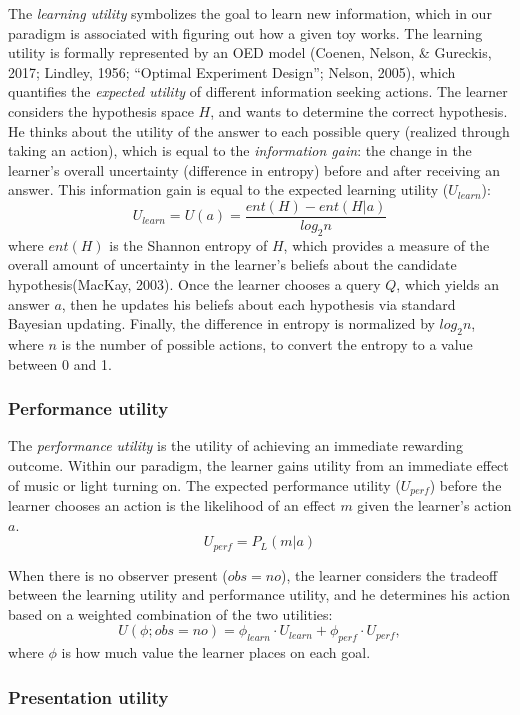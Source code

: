 \documentclass[10pt, letterpaper]{article}
\begin{document}
The \emph{learning utility} symbolizes the goal to learn new
information, which in our paradigm is associated with figuring out how a
given toy works. The learning utility is formally represented by an OED
model (Coenen, Nelson, \& Gureckis, 2017; Lindley, 1956; ``Optimal
Experiment Design''; Nelson, 2005), which quantifies the \emph{expected
utility} of different information seeking actions. The learner considers
the hypothesis space \(H\), and wants to determine the correct
hypothesis. He thinks about the utility of the answer to each possible
query (realized through taking an action), which is equal to the
\emph{information gain}: the change in the learner's overall uncertainty
(difference in entropy) before and after receiving an answer. This
information gain is equal to the expected learning utility
(\(U_{learn}\)):
\[ U_{learn} = U(a) = \frac{ent(H) - ent(H|a)}{log_2n}\] \noindent
where \(ent(H)\) is the Shannon entropy of \(H\), which provides a
measure of the overall amount of uncertainty in the learner's beliefs
about the candidate hypothesis(MacKay, 2003). Once the learner chooses a
query \(Q\), which yields an answer \(a\), then he updates his beliefs
about each hypothesis via standard Bayesian updating. Finally, the
difference in entropy is normalized by \(log_2 n\), where \(n\) is the
number of possible actions, to convert the entropy to a value between 0
and 1.

\subsubsection{Performance utility}\label{performance-utility}

The \emph{performance utility} is the utility of achieving an immediate
rewarding outcome. Within our paradigm, the learner gains utility from
an immediate effect of music or light turning on. The expected
performance utility (\(U_{perf}\)) before the learner chooses an action
is the likelihood of an effect \(m\) given the learner's action \(a\).
\[ U_{perf} = P_L(m | a) \] \noindent

When there is no observer present (\(obs = no\)), the learner considers
the tradeoff between the learning utility and performance utility, and
he determines his action based on a weighted combination of the two
utilities:
\[ U(\phi; obs = no) = \phi_{learn} \cdot U_{learn} + \phi_{perf} \cdot U_{perf} ,\]
\noindent
where \(\phi\) is how much value the learner places on each goal.

\subsubsection{Presentation utility}\label{presentation-utility}
\end{document}
